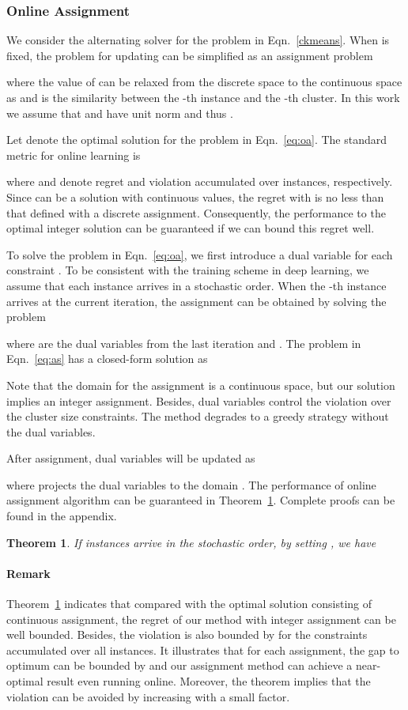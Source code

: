 \documentclass[10pt,twocolumn,letterpaper]{article}
\newtheorem{thm}{Theorem}
\begin{document}
\subsubsection{Online Assignment}
We consider the alternating solver for the problem in Eqn.~\ref{ckmeans}. When  is fixed, the problem for updating  can be simplified as an assignment problem

where the value of  can be relaxed from the discrete space to the continuous space as  and  is the similarity between the -th instance and the -th cluster. In this work we assume that  and  have unit norm and thus .

Let  denote the optimal solution for the problem in Eqn.~\ref{eq:oa}. The standard metric for online learning is

where  and  denote regret and violation accumulated over  instances, respectively. Since  can be a solution with continuous values, the regret with  is no less than that defined with a discrete assignment. Consequently, the performance to the optimal integer solution can be guaranteed if we can bound this regret well.

To solve the problem in Eqn.~\ref{eq:oa}, we first introduce a dual variable  for each constraint . To be consistent with the training scheme in deep learning, we assume that each instance arrives in a stochastic order. When the -th instance arrives at the current iteration, the assignment can be obtained by solving the problem

where  are the dual variables from the last iteration and . The problem in Eqn.~\ref{eq:as} has a closed-form solution as

Note that the domain for the assignment is a continuous space, but our solution implies an integer assignment. Besides, dual variables control the violation over the cluster size constraints. The method degrades to a greedy strategy without the dual variables.  

After assignment, dual variables will be updated as

where  projects the dual variables to the domain . The performance of online assignment algorithm can be guaranteed in Theorem~\ref{thm:1}. Complete proofs can be found in the appendix.


\begin{thm}\label{thm:1}
If instances arrive in the stochastic order, by setting , we have

\end{thm}

\paragraph{Remark} Theorem~\ref{thm:1} indicates that compared with the optimal solution consisting of continuous assignment, the regret of our method with integer assignment can be well bounded. Besides, the violation is also bounded by  for the constraints accumulated over all instances. It illustrates that for each assignment, the gap to optimum can be bounded by  and our assignment method can achieve a near-optimal result even running online. Moreover, the theorem implies that the violation can be avoided by increasing  with a small factor.
\end{document}
